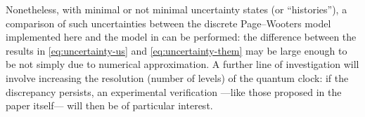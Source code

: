 \citereset
Nonetheless, with minimal or not minimal uncertainty states (or ``histories''),
a comparison of such uncertainties between the discrete Page--Wooters model implemented
here and the model in \cite{RuschhauptAbsorption} can be performed:
the difference between the results in \eqref{eq:uncertainty-us}
and \eqref{eq:uncertainty-them} may be large enough to be not simply
due to numerical approximation. A further line of investigation
will involve increasing the resolution (number of levels) of the quantum clock:
if the discrepancy persists, an experimental verification
---like those proposed in the paper itself---
will then be of
particular interest.
